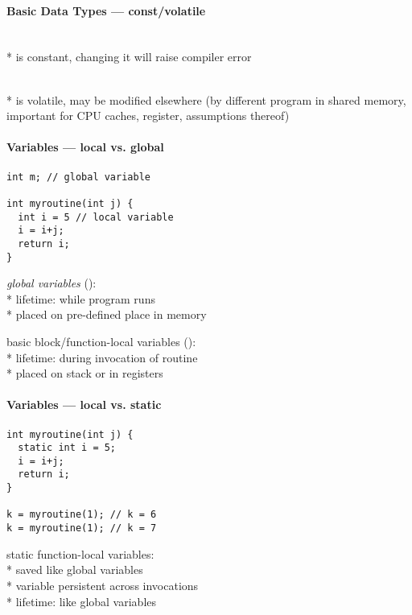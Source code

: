 \paragraph{Basic Data Types --- const/volatile}
\begin{items}
  \item {} \\*
     is constant, changing it will raise compiler error
  \item {} \\*
     is volatile, may be modified elsewhere (by different program in shared memory, important for CPU caches, register, assumptions thereof)
\end{items}

\paragraph{Variables --- local vs. global}
\begin{lstlisting}[style=customc]
int m; // global variable

int myroutine(int j) {
  int i = 5 // local variable
  i = i+j;
  return i;
}
\end{lstlisting}
\begin{items}
  \item \emph{global variables} (): \\*
    lifetime: while program runs \\*
    placed on pre-defined place in memory
  \item basic block/function-local variables (): \\*
    lifetime: during invocation of routine \\*
    placed on stack or in registers
\end{items}

\paragraph{Variables --- local vs. static}
\begin{lstlisting}[style=customc]
int myroutine(int j) {
  static int i = 5;
  i = i+j;
  return i;
}

k = myroutine(1); // k = 6
k = myroutine(1); // k = 7
\end{lstlisting}
\begin{items}
  \item static function-local variables: \\*
    saved like global variables \\*
    variable persistent across invocations \\*
    lifetime: like global variables
\end{items}


